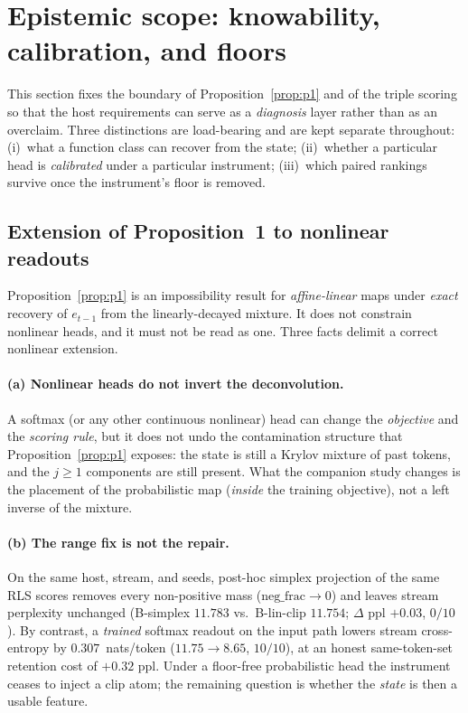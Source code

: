 \documentclass[preprint,12pt]{elsarticle}
\begin{document}
\section{Epistemic scope: knowability, calibration, and floors}
\label{sec:epi}

This section fixes the boundary of Proposition~\ref{prop:p1} and of the
triple scoring so that the host requirements can serve as a
\emph{diagnosis} layer rather than as an overclaim. Three distinctions
are load-bearing and are kept separate throughout: (i)~what a function
class can recover from the state; (ii)~whether a particular head is
\emph{calibrated} under a particular instrument; (iii)~which paired
rankings survive once the instrument's floor is removed.

\subsection{Extension of Proposition~1 to nonlinear readouts}
\label{sec:p1nl}

Proposition~\ref{prop:p1} is an impossibility result for
\emph{affine-linear} maps under \emph{exact} recovery of
$e_{t-1}$ from the linearly-decayed mixture. It does not constrain
nonlinear heads, and it must not be read as one. Three facts delimit a
correct nonlinear extension.

\paragraph{(a) Nonlinear heads do not invert the deconvolution.}
A softmax (or any other continuous nonlinear) head can change the
\emph{objective} and the \emph{scoring rule}, but it does not undo the
contamination structure that Proposition~\ref{prop:p1} exposes: the
state is still a Krylov mixture of past tokens, and the $j\ge 1$
components are still present. What the companion study
\cite{redemf} changes is the placement of the probabilistic map
(\emph{inside} the training objective), not a left inverse of the
mixture.

\paragraph{(b) The range fix is not the repair.}
On the same host, stream, and seeds, post-hoc simplex projection of the
same RLS scores removes every non-positive mass
($\mathrm{neg\_frac}\to 0$) and leaves stream perplexity unchanged
(B-simplex $11.783$ vs.\ B-lin-clip $11.754$; $\Delta$ ppl $+0.03$,
$0/10$). By contrast, a \emph{trained} softmax readout on the input
path lowers stream cross-entropy by $0.307$~nats/token
($11.75\to 8.65$, $10/10$), at an honest same-token-set retention cost
of $+0.32$ ppl. Under a floor-free probabilistic head the instrument
ceases to inject a clip atom; the remaining question is whether the
\emph{state} is then a usable feature.
\end{document}
